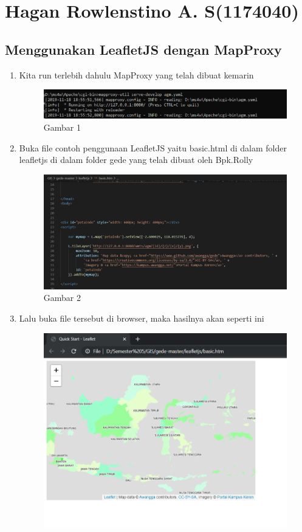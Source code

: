 \section{Hagan Rowlenstino A. S(1174040)}
\subsection{Menggunakan LeafletJS dengan MapProxy}
\begin{enumerate}
    \item Kita run terlebih dahulu MapProxy yang telah dibuat kemarin
    \hfill\break
    \begin{figure}[H]
		\includegraphics[width=12cm]{figures/1174040/Python4/1.PNG}
		\centering
		\caption{Gambar 1}
	\end{figure}
    \item Buka file contoh penggunaan LeafletJS yaitu basic.html di dalam folder leafletjs di dalam folder gede yang telah dibuat oleh Bpk.Rolly
    \hfill\break
    \begin{figure}[H]
		\includegraphics[width=12cm]{figures/1174040/Python4/2.PNG}
		\centering
		\caption{Gambar 2}
	\end{figure}
    \item Lalu buka file tersebut di browser, maka hasilnya akan seperti ini
    \hfill\break
    \begin{figure}[H]
		\includegraphics[width=12cm]{figures/1174040/Python4/3.PNG}

\end{figure}
\end{enumerate}
